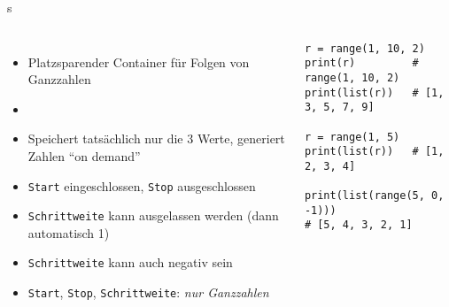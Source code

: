 \begin{frame}[fragile]{s}
%
\begin{columns}[T]
\begin{itemize}
\item Platzsparender Container für Folgen von Ganzzahlen
\item {}
\item Speichert tatsächlich nur die 3 Werte, generiert Zahlen \enquote{on demand}
\item \texttt{Start} eingeschlossen, \texttt{Stop} ausgeschlossen
\item \texttt{Schrittweite} kann ausgelassen werden (dann automatisch 1)
\item \texttt{Schrittweite} kann auch negativ sein
\item \texttt{Start}, \texttt{Stop}, \texttt{Schrittweite}: \emph{nur Ganzzahlen}
\end{itemize}
%
\begin{codebox}
\begin{verbatim}
r = range(1, 10, 2)
print(r)         # range(1, 10, 2)
print(list(r))   # [1, 3, 5, 7, 9]

r = range(1, 5)
print(list(r))   # [1, 2, 3, 4]

print(list(range(5, 0, -1)))
# [5, 4, 3, 2, 1]

\end{verbatim}
\end{codebox}
\end{columns}
%
\end{frame}


